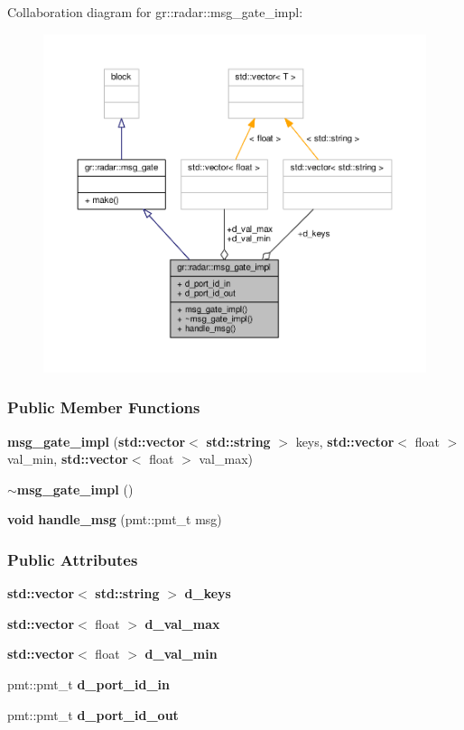 Collaboration diagram for gr\+:\+:radar\+:\+:msg\+\_\+gate\+\_\+impl\+:
\nopagebreak
\begin{figure}[H]
\begin{center}
\leavevmode
\includegraphics[width=350pt]{d6/d72/classgr_1_1radar_1_1msg__gate__impl__coll__graph}
\end{center}
\end{figure}
\subsubsection*{Public Member Functions}
\begin{DoxyCompactItemize}
\item 
{\bf msg\+\_\+gate\+\_\+impl} ({\bf std\+::vector}$<$ {\bf std\+::string} $>$ keys, {\bf std\+::vector}$<$ float $>$ val\+\_\+min, {\bf std\+::vector}$<$ float $>$ val\+\_\+max)
\item 
{\bf $\sim$msg\+\_\+gate\+\_\+impl} ()
\item 
{\bf void} {\bf handle\+\_\+msg} (pmt\+::pmt\+\_\+t msg)
\end{DoxyCompactItemize}
\subsubsection*{Public Attributes}
\begin{DoxyCompactItemize}
\item 
{\bf std\+::vector}$<$ {\bf std\+::string} $>$ {\bf d\+\_\+keys}
\item 
{\bf std\+::vector}$<$ float $>$ {\bf d\+\_\+val\+\_\+max}
\item 
{\bf std\+::vector}$<$ float $>$ {\bf d\+\_\+val\+\_\+min}
\item 
pmt\+::pmt\+\_\+t {\bf d\+\_\+port\+\_\+id\+\_\+in}
\item 
pmt\+::pmt\+\_\+t {\bf d\+\_\+port\+\_\+id\+\_\+out}
\end{DoxyCompactItemize}

